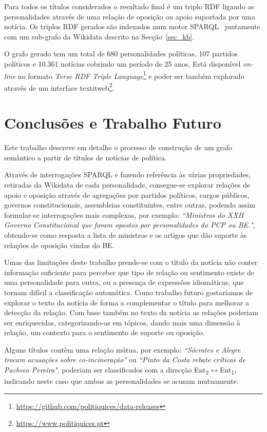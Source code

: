 \documentclass[a4paper, twocolumn, 11pt, twoside]{article}
\begin{document}
Para todos os títulos considerados o resultado final é um triplo RDF ligando as personalidades através de uma relação de oposição ou apoio suportada por uma notícia. Os triplos RDF gerados são indexados num motor SPARQL~\citep{jena2015free} juntamente com um sub-grafo da Wikidata descrito na Secção~\ref{sec_kb}.

O grafo gerado tem um total de 680 personalidades políticas, 107 partidos políticos e 10.361 notícias cobrindo um período de 25 anos, Está disponível \textit{on-line} no formato \textit{Terse RDF Triple Language}\footnote{\url{https://github.com/politiquices/data-releases}} e poder ser também explorado através de um interface textit{web}\footnote{\url{https://www.politiquices.pt}}.

\section{Conclusões e Trabalho Futuro}
\label{sec:future_work}
Este trabalho descreve em detalhe o processo de construção de um grafo semântico a partir de títulos de notícias de política. 

Através de interrogações SPARQL e fazendo referência às várias propriedades, retiradas da Wikidata de cada personalidade, consegue-se explorar relações de apoio e oposição através de agregações por partidos políticos, cargos públicos, governos constitucionais, assembleias constituintes, entre outras, podendo assim formular-se interrogações mais complexas, por exemplo: \textit{``Ministros do XXII Governo Constitucional que foram opostos por personalidades do PCP ou BE."}, obtendo-se como resposta a lista de ministros e os artigos que dão suporte às relações de oposição vindas do BE.

Umas das limitações deste trabalho prende-se com o título da notícia não conter informação suficiente para perceber que tipo de relação ou sentimento existe de uma personalidade para outra, ou a presença de expressões idiomáticas, que tornam difícil a classificação automática. Como trabalho futuro gostaríamos de explorar o texto da notícia de forma a complementar o título para melhorar a detecção da relação. Com base também no texto da notícia as relações poderiam ser enriquecidas, categorizando-as em tópicos, dando mais uma dimensão à relação, um contexto para o sentimento de suporte ou oposição.

Alguns títulos contêm uma relação mútua, por exemplo: \textit{``Sócrates e Alegre trocam acusações sobre co-incineração"} ou \textit{``Pinto da Costa rebate críticas de Pacheco Pereira"}, poderiam ser classificados com a direcção Ent\textsubscript{2}$\leftrightarrow$Ent\textsubscript{1}, indicando neste caso que ambas as personalidades se acusam mutuamente.
\end{document}
